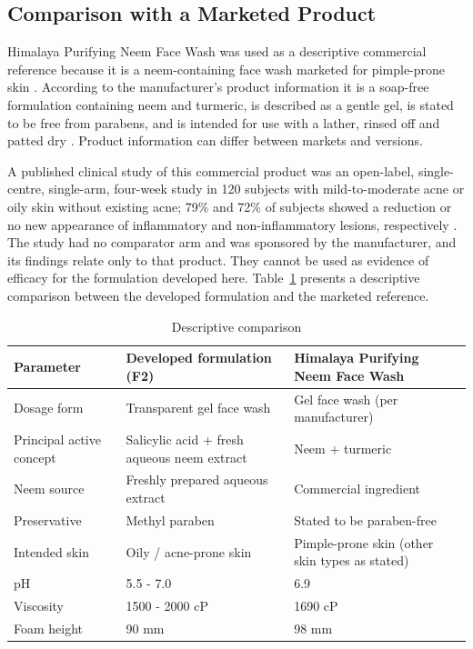 \documentclass[10pt,a4paper,twocolumn]{article}
\begin{document}
\subsection*{Comparison with a Marketed Product}

Himalaya Purifying Neem Face Wash was used as a descriptive commercial
reference because it is a neem-containing face wash marketed for
pimple-prone skin \citep{himalaya2026}. According to the manufacturer's
product information it is a soap-free formulation containing neem and
turmeric, is described as a gentle gel, is stated to be free from
parabens, and is intended for use with a lather, rinsed off and patted
dry \citep{himalaya2026}. Product information can differ between markets
and versions.

A published clinical study of this commercial product was an open-label,
single-centre, single-arm, four-week study in 120 subjects with
mild-to-moderate acne or oily skin without existing acne; 79\% and 72\%
of subjects showed a reduction or no new appearance of inflammatory and
non-inflammatory lesions, respectively \citep{yogesh2022}. The study had
no comparator arm and was sponsored by the manufacturer, and its findings
relate only to that product. They cannot be used as evidence of efficacy
for the formulation developed here. Table~\ref{tab:comparison} presents a descriptive comparison between the developed formulation and the marketed reference.

\begin{table}[!htbp]
\centering

\renewcommand{\arraystretch}{1.3}
\begin{tabularx}{\textwidth}{lXX}
\toprule
\textbf{Parameter} &
\textbf{Developed formulation (F2)} &
\textbf{Himalaya Purifying Neem Face Wash \citep{himalaya2026}} \\
\midrule
Dosage form
  & Transparent gel face wash & Gel face wash (per manufacturer) \\
Principal active concept
  & Salicylic acid + fresh aqueous neem extract & Neem + turmeric \\
Neem source
  & Freshly prepared aqueous extract 
  & Commercial ingredient \\
Preservative
  & Methyl paraben & Stated to be paraben-free \\
Intended skin
  & Oily / acne-prone skin
  & Pimple-prone skin (other skin types as stated) \\
pH
  & 5.5 - 7.0  & 6.9 \\
Viscosity
  & 1500 - 2000 cP & 1690 cP \\
Foam height
  & 90 mm & 98 mm \\

\bottomrule
\end{tabularx}
\caption{Descriptive comparison }
\label{tab:comparison}
\end{table}
\end{document}
